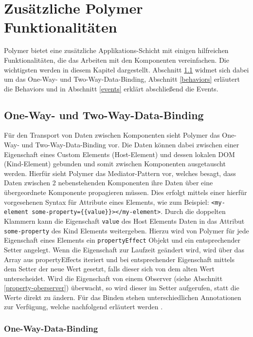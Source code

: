 \chapter{Zusätzliche Polymer Funktionalitäten}\label{zusaetzliche-polymer-funktionalitaeten}

Polymer bietet eine zusätzliche Applikations-Schicht mit einigen hilfreichen Funktionalitäten, die das Arbeiten mit den Komponenten vereinfachen. Die wichtigsten werden in diesem Kapitel dargestellt. Abschnitt \ref{one-way--und-two-way-data-binding} widmet sich dabei um das One-Way- und Two-Way-Data-Binding, Abschnitt \ref{behaviors} erläutert die Behaviors und in Abschnitt \ref{events} erklärt abschließend die Events.


\section{One-Way- und Two-Way-Data-Binding}\label{one-way--und-two-way-data-binding}

Für den Transport von Daten zwischen Komponenten sieht Polymer das One-Way- und Two-Way-Data-Binding vor. Die Daten können dabei zwischen einer Eigenschaft eines Custom Elements (Host-Element) und dessen lokalen \ac{DOM} (Kind-Element) gebunden und somit zwischen Komponenten ausgetauscht werden. Hierfür sieht Polymer das Mediator-Pattern vor, welches besagt, dass Daten zwischen 2 nebenstehenden Komponenten ihre Daten über eine übergeordnete Komponente propagieren müssen. Dies erfolgt mittels einer hierfür vorgesehenen Syntax für Attribute eines Elements, wie zum Beispiel: \texttt{\textless{}my-element\ some-property=\{\{value\}\}\textgreater{}\textless{}/my-element\textgreater{}}. Durch die doppelten Klammern kann die Eigenschaft \texttt{value} des Host Elements Daten in das Attribut \texttt{some-property} des Kind Elements weitergeben. Hierzu wird von Polymer für jede Eigenschaft eines Elements ein \texttt{propertyEffect} Objekt und ein entsprechender Setter angelegt. Wenn die Eigenschaft zur Laufzeit geändert wird, wird über das Array aus propertyEffects iteriert und bei entsprechender Eigenschaft mittels dem Setter der neue Wert gesetzt, falls dieser sich von dem alten Wert unterscheidet. Wird die Eigenschaft von einem Observer (siehe Abschnitt \ref{property-oberserver}) überwacht, so wird dieser im Setter aufgerufen, statt die Werte direkt zu ändern. Für das Binden stehen unterschiedlichen Annotationen zur Verfügung, welche nachfolgend erläutert werden \cite{citeulike:13914892}.


\subsection{One-Way-Data-Binding}\label{one-way-data-binding}

